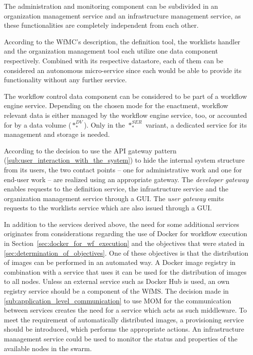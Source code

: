   The administration and monitoring component can be subdivided in an organization management service and an infrastructure management service, as these functionalities are completely independent from each other.

  According to the \ac{WfMC}'s description, the definition tool, the worklists handler and the organization management tool each utilize one data component respectively. Combined with its respective datastore, each of them can be considered an autonomous micro-service since each would be able to provide its functionality without any further service.

  The workflow control data component can be considered to be part of a workflow engine service.
  Depending on the chosen mode for the enactment, workflow relevant data is either managed by the workflow engine service, too, or accounted for by a data volume ($*_{*}^{DV}$). Only in the $*_{*}^{SER}$ variant, a dedicated service for its management and storage is needed.

  According to the decision to use the \ac{API} gateway pattern (\ref{sub:user_interaction_with_the_system}) to hide the internal system structure from its users, the two contact points -- one for administrative work and one for end-user work -- are realized using an appropriate gateway. The \emph{developer gateway} enables requests to the definition service, the infrastructure service and the organization management service through a \ac{GUI}. The \emph{user gateway} emits requests to the worklists service which are also issued through a \ac{GUI}.

  In addition to the services derived above, the need for some additional services originates from considerations regarding the use of Docker for workflow execution in Section~\ref{sec:docker_for_wf_execution} and the objectives that were stated in \ref{sec:determination_of_objectives}.
  One of these objectives is that the distribution of images can be performed in an automated way. A Docker image registry in combination with a service that uses it can be used for the distribution of images to all nodes. Unless an external service such as Docker Hub is used, an own registry service should be a component of the \ac{WfMS}.
  The decision made in \ref{sub:application_level_communication} to use \ac{MOM} for the communication between services creates the need for a service which acts as such middleware.
  To meet the requirement of automatically distributed images, a provisioning service should be introduced, which performs the appropriate actions. An infrastructure management service could be used to monitor the status and properties of the available nodes in the swarm.

